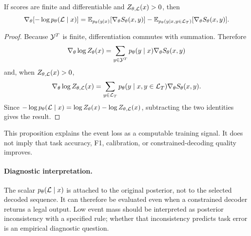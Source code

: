 \begin{proposition}
If scores are finite and differentiable and \(Z_{\theta,\mathcal{L}}(x)>0\), then
\[
\nabla_{\theta}[-\log p_{\theta}(\mathcal{L} \mid x)]
= \mathbb{E}_{p_{\theta}(y\mid x)}[\nabla_{\theta}S_{\theta}(x,y)]
 - \mathbb{E}_{p_{\theta}(y\mid x,y\in\mathcal{L}_T)}[\nabla_{\theta}S_{\theta}(x,y)].
\]
\end{proposition}

\begin{proof}
Because \(\mathcal{Y}^T\) is finite, differentiation commutes with summation.  Therefore
\[
 \nabla_\theta \log Z_\theta(x)
 = \sum_{y\in\mathcal{Y}^T}p_{\theta}(y\mid x)\nabla_\theta S_\theta(x,y)
\]
and, when \(Z_{\theta,\mathcal{L}}(x)>0\),
\[
 \nabla_\theta \log Z_{\theta,\mathcal{L}}(x)
 = \sum_{y\in\mathcal{L}_T}p_{\theta}(y\mid x,y\in\mathcal{L}_T)
   \nabla_\theta S_\theta(x,y).
\]
Since \(-\log p_{\theta}(\mathcal{L}\mid x)=\log Z_\theta(x)-\log Z_{\theta,\mathcal{L}}(x)\),
subtracting the two identities gives the result.
\end{proof}

This proposition explains the event loss as a computable training signal.  It
does not imply that task accuracy, F1, calibration, or constrained-decoding
quality improves.

\paragraph{Diagnostic interpretation.}
The scalar \(p_{\theta}(\mathcal{L}\mid x)\) is attached to the original posterior, not
to the selected decoded sequence.  It can therefore be evaluated even when a
constrained decoder returns a legal output.  Low event mass should be
interpreted as posterior inconsistency with a specified rule; whether that
inconsistency predicts task error is an empirical diagnostic question.
